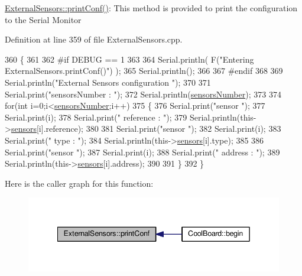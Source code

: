 \hyperlink{class_external_sensors_a78c2bf55084435dd51d3c559b2d3c6f3}{External\+Sensors\+::print\+Conf()}\+: This method is provided to print the configuration to the Serial Monitor 

Definition at line 359 of file External\+Sensors.\+cpp.


\begin{DoxyCode}
360 \{
361 
362 \textcolor{preprocessor}{#if DEBUG == 1}
363 
364     Serial.println( F(\textcolor{stringliteral}{"Entering ExternalSensors.printConf()"}) );
365     Serial.println();
366 
367 \textcolor{preprocessor}{#endif }
368 
369     Serial.println(\textcolor{stringliteral}{"External Sensors configuration "});
370 
371     Serial.print(\textcolor{stringliteral}{"sensorsNumber : "});
372     Serial.println(\hyperlink{class_external_sensors_a58e4fbf9adeae787d92be5fa33043b5d}{sensorsNumber});
373 
374     \textcolor{keywordflow}{for}(\textcolor{keywordtype}{int} i=0;i<\hyperlink{class_external_sensors_a58e4fbf9adeae787d92be5fa33043b5d}{sensorsNumber};i++)
375     \{
376         Serial.print(\textcolor{stringliteral}{"sensor "});
377         Serial.print(i);
378         Serial.print(\textcolor{stringliteral}{" reference : "});
379         Serial.println(this->\hyperlink{class_external_sensors_a284233f884fcf00154a44740cf1d9e1e}{sensors}[i].reference);
380 
381         Serial.print(\textcolor{stringliteral}{"sensor "});
382         Serial.print(i);
383         Serial.print(\textcolor{stringliteral}{" type : "});
384         Serial.println(this->\hyperlink{class_external_sensors_a284233f884fcf00154a44740cf1d9e1e}{sensors}[i].type);
385                 
386         Serial.print(\textcolor{stringliteral}{"sensor "});
387         Serial.print(i);
388         Serial.print(\textcolor{stringliteral}{" address : "});
389         Serial.println(this->\hyperlink{class_external_sensors_a284233f884fcf00154a44740cf1d9e1e}{sensors}[i].address);
390     
391     \}
392 \}
\end{DoxyCode}
Here is the caller graph for this function\+:\nopagebreak
\begin{figure}[H]
\begin{center}
\leavevmode
\includegraphics[width=342pt]{d1/d2f/class_external_sensors_a78c2bf55084435dd51d3c559b2d3c6f3_icgraph}
\end{center}
\end{figure}
\mbox{\label{class_external_sensors_a53177b81eca3be89508b5511ddcd00fc}} 
